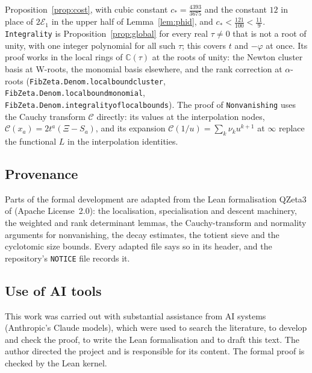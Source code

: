 \documentclass[11pt]{amsart}
\theoremstyle{definition}
\theoremstyle{remark}
\numberwithin{equation}{section}
\newcommand{\CC}{\mathbb{C}}
\newcommand{\cC}{\mathcal{C}}
\newcommand{\lean}[1]{{\def\_{\textunderscore\allowbreak}\texttt{#1}}}
\begin{document}
Proposition~\ref{prop:cost}, with cubic constant $c_*=\frac{4393}{3675}$ and the constant $12$ in place of
$2\mathcal E_1$ in the upper half of Lemma~\ref{lem:phid}, and $c_*<\frac{121}{100}<\frac{11}9$. \lean{Integrality} is
Proposition~\ref{prop:global} for every real $\tau\ne0$ that is not a root of unity, with one integer polynomial for
all such $\tau$; this covers $t$ and $-\varphi$ at once. Its proof works in the local rings of $\CC(\tau)$ at the roots
of unity: the Newton cluster basis at W-roots, the monomial basis elsewhere, and the rank correction at
$\alpha$-roots (\lean{FibZeta.Denom.local\_bound\_cluster}, \lean{FibZeta.Denom.local\_bound\_monomial},
\lean{FibZeta.Denom.integrality\_of\_local\_bounds}). The proof of \lean{Nonvanishing} uses the Cauchy transform $\cC$
directly: its values at the interpolation nodes, $\cC(x_a)=2t^a(\Xi-S_a)$, and its expansion
$\cC(1/u)=\sum_k\nu_ku^{k+1}$ at $\infty$ replace the functional $L$ in the interpolation identities.

\subsection*{Provenance}
Parts of the formal development are adapted from the Lean formalisation QZeta3 \cite{QZ3} of \cite{UPL} (Apache
License~2.0): the localisation, specialisation and descent machinery, the weighted and rank determinant lemmas, the
Cauchy-transform and normality arguments for nonvanishing, the decay estimates, the totient sieve and the cyclotomic
size bounds. Every adapted file says so in its header, and the repository's \lean{NOTICE} file records it.

\subsection*{Use of AI tools}
This work was carried out with substantial assistance from AI systems (Anthropic's Claude models), which were used to
search the literature, to develop and check the proof, to write the Lean formalisation and to draft this text. The
author directed the project and is responsible for its content. The formal proof is checked by the Lean kernel.



\end{document}
